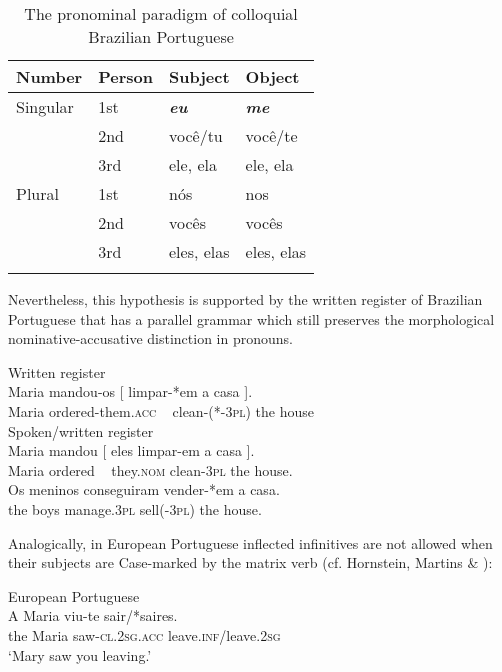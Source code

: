 \documentclass[output=paper]{langsci/langscibook}
\begin{document}
\begin{table}
\caption{\label{tab:moreno:1}The pronominal paradigm of colloquial Brazilian Portuguese}
\begin{tabular}{llll}
\lsptoprule
{Number}   & Person & Subject & Object\\\midrule
{Singular} & 1st & \textbf{\textit{eu}} & \textbf{\textit{me}}\\
           & 2nd & você/tu & você/te\\
           & 3rd & ele, ela & ele, ela\\\midrule
{Plural}   & 1st & nós & nos\\
           & 2nd & vocês & vocês\\
           & 3rd & eles, elas & eles, elas\\
\lspbottomrule
\end{tabular}
\end{table}

Nevertheless, this hypothesis is supported by the written register of Brazilian Portuguese that has a parallel grammar which still preserves the morphological nominative-accusative distinction in pronouns.

\ea%
    \label{ex:moreno:24}
    \ea  Written register\\
    \gll Maria mandou-os     [  limpar-*em    a    casa ].   \\
         Maria ordered-them.\textsc{acc}   ~    clean-(*-\textsc{3pl}) the house\\
    \ex  Spoken/written register\\
    \gll Maria mandou [ eles   limpar-em a    casa ].   \\
         Maria ordered  ~  they.\textsc{nom} clean-\textsc{3pl}  the house. \\
    \ex  
    \gll Os meninos conseguiram  vender-*em  a    casa. \\
         the boys      manage.\textsc{3pl}    sell(-\textsc{3pl})     the house. \\
\z
\z

Analogically, in European Portuguese inflected infinitives are not allowed when their subjects are Case-marked by the matrix verb (cf. Hornstein, Martins \& \citealt{Nunes2008}):

\ea%
         European Portuguese\label{ex:moreno:25}\\
    \gll A   Maria viu-te           sair/*saires.\\
         the Maria saw-\textsc{cl.2sg.acc} leave.\textsc{inf}/leave.\textsc{2sg}\\
    \glt ‘Mary saw you leaving.’
\z
\end{document}
